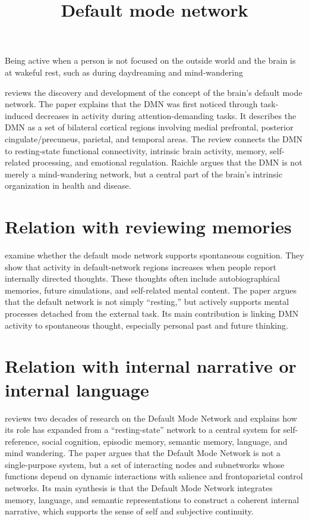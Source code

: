 \documentclass[a4paper]{article}
\title{Default mode network}
\date{}
\begin{document}
    \maketitle
    Being active when a person is not focused on the outside world and the brain is at wakeful rest, such as during daydreaming and mind-wandering 
    
    \cite{raichle-2015-the-brains-default-mode-network} reviews the discovery and development of the concept of the brain’s default mode network. The paper explains that the DMN was first noticed through task-induced decreases in activity during attention-demanding tasks.
    It describes the DMN as a set of bilateral cortical regions involving medial prefrontal, posterior cingulate/precuneus, parietal, and temporal areas. The review connects the DMN to resting-state functional connectivity, intrinsic brain activity, memory, self-related processing, and emotional regulation. Raichle argues that the DMN is not merely a mind-wandering network, but a central part of the brain’s intrinsic organization in health and disease.
    
    
    \section{Relation with reviewing memories}
        \cite{andrews-hanna-2010-evidence-for-the-default-networks-role-in-spontaneous-cognition}
        examine whether the default mode network supports spontaneous cognition. They show that activity in default-network regions increases when people report internally directed thoughts. These thoughts often include autobiographical memories, future simulations, and self-related mental content. The paper argues that the default network is not simply “resting,” but actively supports mental processes detached from the external task. Its main contribution is linking DMN activity to spontaneous thought, especially personal past and future thinking.
    
    
    \section{Relation with internal narrative or internal language}
        \cite{menon-2023-20-years-of-the-default-mode-network-a-review-and-synthesis} reviews two decades of research on the Default Mode Network and explains how its role has expanded from a “resting-state” network to a central system for self-reference, social cognition, episodic memory, semantic memory, language, and mind wandering. The paper argues that the Default Mode Network is not a single-purpose system, but a set of interacting nodes and subnetworks whose functions depend on dynamic interactions with salience and frontoparietal control networks. Its main synthesis is that the Default Mode Network integrates memory, language, and semantic representations to construct a coherent internal narrative, which supports the sense of self and subjective continuity.
        
        
        
\end{document}
